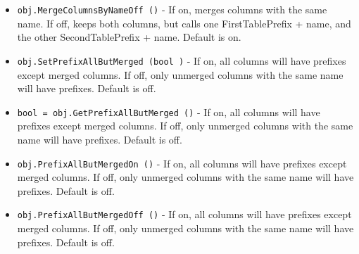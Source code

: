 \begin{itemize}
\item  \verb|obj.MergeColumnsByNameOff ()| -  If on, merges columns with the same name.
 If off, keeps both columns, but calls one
 FirstTablePrefix + name, and the other SecondTablePrefix + name.
 Default is on.

\item  \verb|obj.SetPrefixAllButMerged (bool )| -  If on, all columns will have prefixes except merged columns.
 If off, only unmerged columns with the same name will have prefixes.
 Default is off.

\item  \verb|bool = obj.GetPrefixAllButMerged ()| -  If on, all columns will have prefixes except merged columns.
 If off, only unmerged columns with the same name will have prefixes.
 Default is off.

\item  \verb|obj.PrefixAllButMergedOn ()| -  If on, all columns will have prefixes except merged columns.
 If off, only unmerged columns with the same name will have prefixes.
 Default is off.

\item  \verb|obj.PrefixAllButMergedOff ()| -  If on, all columns will have prefixes except merged columns.
 If off, only unmerged columns with the same name will have prefixes.
 Default is off.

\end{itemize}
